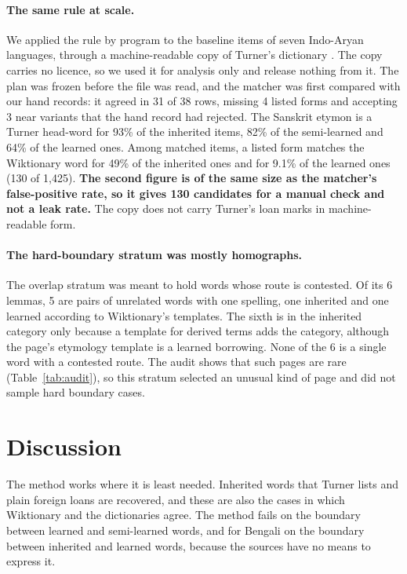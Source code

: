 \documentclass[11pt]{article}
\begin{document}
\paragraph{The same rule at scale.} We applied the rule by program to the baseline items of seven Indo-Aryan languages, through a machine-readable copy of Turner's dictionary \citep{arora2023jambu}. The copy carries no licence, so we used it for analysis only and release nothing from it. The plan was frozen before the file was read, and the matcher was first compared with our hand records: it agreed in 31 of 38 rows, missing 4 listed forms and accepting 3 near variants that the hand record had rejected. The Sanskrit etymon is a Turner head-word for 93\% of the inherited items, 82\% of the semi-learned and 64\% of the learned ones. Among matched items, a listed form matches the Wiktionary word for 49\% of the inherited ones and for 9.1\% of the learned ones (130 of 1,425). \textbf{The second figure is of the same size as the matcher's false-positive rate, so it gives 130 candidates for a manual check and not a leak rate.} The copy does not carry Turner's loan marks in machine-readable form.

\paragraph{The hard-boundary stratum was mostly homographs.} The overlap stratum was meant to hold words whose route is contested. Of its 6 lemmas, 5 are pairs of unrelated words with one spelling, one inherited and one learned according to Wiktionary's templates. The sixth is in the inherited category only because a template for derived terms adds the category, although the page's etymology template is a learned borrowing. None of the 6 is a single word with a contested route. The audit shows that such pages are rare (Table~\ref{tab:audit}), so this stratum selected an unusual kind of page and did not sample hard boundary cases.

\section{Discussion}

The method works where it is least needed. Inherited words that Turner lists and plain foreign loans are recovered, and these are also the cases in which Wiktionary and the dictionaries agree. The method fails on the boundary between learned and semi-learned words, and for Bengali on the boundary between inherited and learned words, because the sources have no means to express it.
\end{document}

